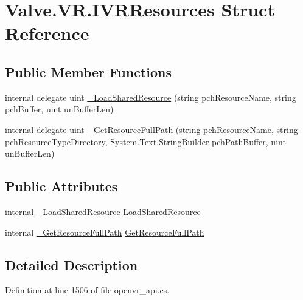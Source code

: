 \hypertarget{struct_valve_1_1_v_r_1_1_i_v_r_resources}{}\section{Valve.\+V\+R.\+I\+V\+R\+Resources Struct Reference}
\label{struct_valve_1_1_v_r_1_1_i_v_r_resources}
\subsection*{Public Member Functions}
\begin{DoxyCompactItemize}
\item 
internal delegate uint \mbox{\hyperlink{struct_valve_1_1_v_r_1_1_i_v_r_resources_a47884b57d0f09e94f051c25d7e05037e}{\+\_\+\+Load\+Shared\+Resource}} (string pch\+Resource\+Name, string pch\+Buffer, uint un\+Buffer\+Len)
\item 
internal delegate uint \mbox{\hyperlink{struct_valve_1_1_v_r_1_1_i_v_r_resources_a288dac70d54efc2dcbfdd73e66ead2a2}{\+\_\+\+Get\+Resource\+Full\+Path}} (string pch\+Resource\+Name, string pch\+Resource\+Type\+Directory, System.\+Text.\+String\+Builder pch\+Path\+Buffer, uint un\+Buffer\+Len)
\end{DoxyCompactItemize}
\subsection*{Public Attributes}
\begin{DoxyCompactItemize}
\item 
internal \mbox{\hyperlink{struct_valve_1_1_v_r_1_1_i_v_r_resources_a47884b57d0f09e94f051c25d7e05037e}{\+\_\+\+Load\+Shared\+Resource}} \mbox{\hyperlink{struct_valve_1_1_v_r_1_1_i_v_r_resources_a451c2aa63cced8dc34cadf4f20f5c071}{Load\+Shared\+Resource}}
\item 
internal \mbox{\hyperlink{struct_valve_1_1_v_r_1_1_i_v_r_resources_a288dac70d54efc2dcbfdd73e66ead2a2}{\+\_\+\+Get\+Resource\+Full\+Path}} \mbox{\hyperlink{struct_valve_1_1_v_r_1_1_i_v_r_resources_a7446f46425cce1a9098868fa7235bb20}{Get\+Resource\+Full\+Path}}
\end{DoxyCompactItemize}


\subsection{Detailed Description}


Definition at line 1506 of file openvr\+\_\+api.\+cs.



